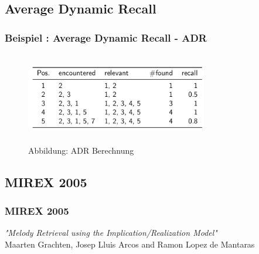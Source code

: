 \documentclass{beamer}
\begin{document}
	\subsection{Average Dynamic Recall}

		\begin{frame}
			\frametitle{Beispiel : Average Dynamic Recall - ADR}
			\begin{figure}[h!]
				\includegraphics[width=300px,height=150px,keepaspectratio]{adr_example}
				\caption{Abbildung: ADR Berechnung \cite{three}}
			\end{figure}
		\end{frame}

	\subsection{MIREX 2005}
		\begin{frame}
			\frametitle{MIREX 2005}
			\begin{minipage}{0.45\textwidth}
				\begin{center}
					\textit{"Melody Retrieval using the Implication/Realization Model"} 
					\cite{mirex_2005_one}\\ 
					Maarten Grachten, Josep Lluis Arcos and Ramon Lopez de Mantaras 
				\end{center}
			\end{minipage}%
			\begin{minipage}{0.45\textwidth}
				\begin{figure}[h!]
				\end{figure}
			\end{minipage}
		\end{frame}
\end{document}
